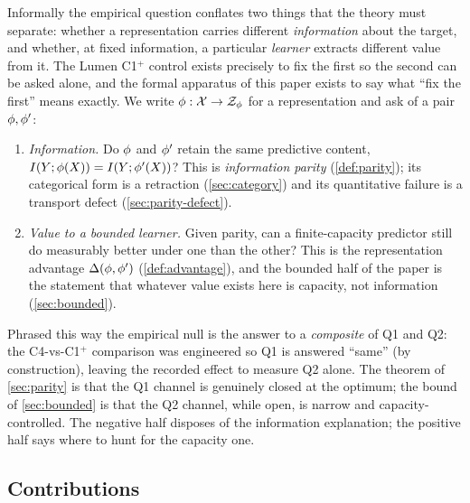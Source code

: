 Informally the empirical question conflates two things that the theory must
separate: whether a representation carries different \emph{information} about the
target, and whether, at fixed information, a particular \emph{learner} extracts
different value from it. The Lumen C1${}^{+}$ control exists precisely to fix the
first so the second can be asked alone, and the formal apparatus of this paper
exists to say what ``fix the first'' means exactly. We write $\phi:\mathcal{X}\to
\mathcal{Z}_{\phi}$ for a representation and ask of a pair $\phi,\phi'$:
\begin{enumerate}
  \item[(Q1)] \emph{Information.} Do $\phi$ and $\phi'$ retain the same
    predictive content, $I(Y ; \phi(X))=I(Y ; \phi'(X))$? This is
    \emph{information parity} (\cref{def:parity}); its categorical form is a
    retraction (\cref{sec:category}) and its quantitative failure is a transport
    defect (\cref{sec:parity-defect}).
  \item[(Q2)] \emph{Value to a bounded learner.} Given parity, can a
    finite-capacity predictor still do measurably better under one than the
    other? This is the representation advantage $\Delta(\phi,\phi')$
    (\cref{def:advantage}), and the bounded half of the paper is the statement
    that whatever value exists here is capacity, not information
    (\cref{sec:bounded}).
\end{enumerate}
Phrased this way the empirical null is the answer to a \emph{composite} of Q1 and
Q2: the C4-vs-C1${}^{+}$ comparison was engineered so Q1 is answered ``same''
(by construction), leaving the recorded effect to measure Q2 alone. The theorem
of \cref{sec:parity} is that the Q1 channel is genuinely closed at the optimum;
the bound of \cref{sec:bounded} is that the Q2 channel, while open, is narrow and
capacity-controlled. The negative half disposes of the information explanation;
the positive half says where to hunt for the capacity one.

\subsection{Contributions}
\label{subsec:intro-contributions}

